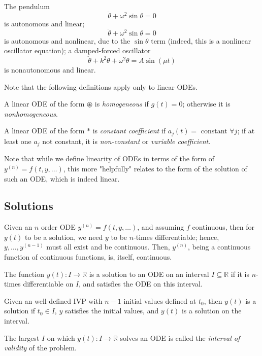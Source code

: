 \begin{example}
    The pendulum $$\ddot{\theta} + \omega^2 \sin \theta = 0$$ is autonomous and linear; $$\ddot{\theta} + \omega^2 \sin \theta = 0$$ is autonomous and nonlinear, due to the $\sin \theta$ term (indeed, this is a nonlinear oscillator equation); a damped-forced oscillator $$\ddot{\theta} + k^2 \dot{\theta} + \omega^2 \theta = A \sin (\mu t)$$ is nonautonomous and linear.
\end{example}

\begin{remark}
    Note that the following definitions apply only to linear ODEs.
\end{remark}

\begin{definition}
    A linear ODE of the form $\circledast$ is \emph{homogeneous} if $g(t) = 0$; otherwise it is \emph{nonhomogeneous}.
\end{definition}

\begin{definition}
    A linear ODE of the form $\ast$ is \emph{constant coefficient} if $a_j(t) = $ constant $\forall j$; if at least one $a_j$ not constant, it is \emph{non-constant} or \emph{variable coefficient}.
\end{definition}

\begin{remark}
    Note that while we define linearity of ODEs in terms of the form of $y^{(n)} = f(t, y, \dots)$, this more "helpfully" relates to the form of the solution of such an ODE, which is indeed linear.
\end{remark}

\subsection{Solutions}

Given an $n$ order ODE $y^{(n)} = f(t, y, \dots)$, and assuming $f$ continuous, then for $y(t)$ to be a solution, we need $y$ to be $n$-times differentiable; hence, $y, \dots, y^{(n-1)}$ must all exist and be continuous. Then, $y^{(n)}$, being a continuous function of continuous functions, is, itself, continuous.

\begin{definition}[Solution]
    The function $y(t) : I \to \mathbb{R}$ is a solution to an ODE on an interval $I \subseteq \mathbb{R}$ if it is $n$-times differentiable on $I$, and satisfies the ODE on this interval.

    Given an well-defined IVP with $n-1$ initial values defined at $t_0$, then $y(t)$ is a solution if $t_0 \in I$, $y$ satisfies the initial values, and $y(t)$ is a solution on the interval.
\end{definition}

\begin{definition}
    The largest $I$ on which $y(t): I \to \mathbb{R}$ solves an ODE is called the \emph{interval of validity} of the problem.
\end{definition}

